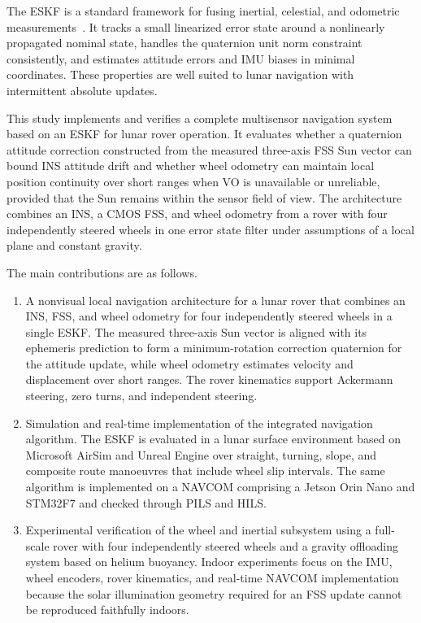 \documentclass[]{IAC_style}
\begin{document}
The ESKF is a standard framework for fusing inertial, celestial, and odometric measurements~\cite{lefferts1982kalman,sola2017quaternion,sveinsson2012insgps,groves2013principles}. It tracks a small linearized error state around a nonlinearly propagated nominal state, handles the quaternion unit norm constraint consistently, and estimates attitude errors and IMU biases in minimal coordinates. These properties are well suited to lunar navigation with intermittent absolute updates.

This study implements and verifies a complete multisensor navigation system based on an ESKF for lunar rover operation. It evaluates whether a quaternion attitude correction constructed from the measured three-axis FSS Sun vector can bound INS attitude drift and whether wheel odometry can maintain local position continuity over short ranges when VO is unavailable or unreliable, provided that the Sun remains within the sensor field of view. The architecture combines an INS, a CMOS FSS, and wheel odometry from a rover with four independently steered wheels in one error state filter under assumptions of a local plane and constant gravity.

The main contributions are as follows.

\begin{enumerate}[label=(\roman*)]
\item A nonvisual local navigation architecture for a lunar rover that combines an INS, FSS, and wheel odometry for four independently steered wheels in a single ESKF. The measured three-axis Sun vector is aligned with its ephemeris prediction to form a minimum-rotation correction quaternion for the attitude update, while wheel odometry estimates velocity and displacement over short ranges. The rover kinematics support Ackermann steering, zero turns, and independent steering.

\item Simulation and real-time implementation of the integrated navigation algorithm. The ESKF is evaluated in a lunar surface environment based on Microsoft AirSim and Unreal Engine over straight, turning, slope, and composite route manoeuvres that include wheel slip intervals. The same algorithm is implemented on a NAVCOM comprising a Jetson Orin Nano and STM32F7 and checked through PILS and HILS.

\item Experimental verification of the wheel and inertial subsystem using a full-scale rover with four independently steered wheels and a gravity offloading system based on helium buoyancy. Indoor experiments focus on the IMU, wheel encoders, rover kinematics, and real-time NAVCOM implementation because the solar illumination geometry required for an FSS update cannot be reproduced faithfully indoors.
\end{enumerate}
\end{document}
